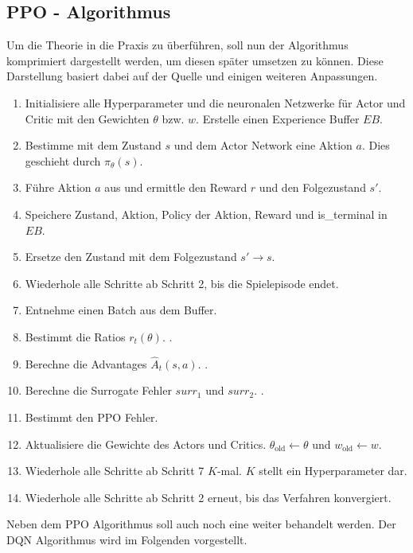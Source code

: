 \subsection{PPO - Algorithmus} \label{subsec:Grundlagen_PPO_Algorithmus}
Um die Theorie in die Praxis zu überführen, soll nun der Algorithmus komprimiert dargestellt werden, um diesen später umsetzen zu können. 
Diese Darstellung basiert dabei auf der Quelle \citep{PPO} und einigen weiteren Anpassungen.
\begin{enumerate}
	\item Initialisiere alle Hyperparameter und die neuronalen Netzwerke für Actor und Critic mit den Gewichten $\theta$ bzw. $w$. Erstelle einen Experience Buffer $EB$.
	\item Bestimme mit dem Zustand $s$ und dem Actor Network eine Aktion $a$. Dies geschieht durch $\pi_{\theta}(s)$.
	\item Führe Aktion $a$ aus und ermittle den Reward $r$ und den Folgezustand $s'$.
	\item Speichere Zustand, Aktion, Policy der Aktion, Reward und is\_terminal in $EB$.
	\item Ersetze den Zustand mit dem Folgezustand $s' \longrightarrow s$.
	\item Wiederhole alle Schritte ab Schritt 2, bis die Spielepisode endet.
	\item Entnehme einen Batch aus dem Buffer.
	\item Bestimmt die Ratios $r_t(\theta)$. .
	\item Berechne die Advantages $\hat{A}_{t}(s, a)$. .
	\item Berechne die Surrogate Fehler $surr_1$ und $surr_2$. .
	\item Bestimmt den PPO Fehler. 
	\item Aktualisiere die Gewichte des Actors und Critics. $\theta_{\text{old}} \longleftarrow \theta$ und $w_{\text{old}} \longleftarrow w$.
	\item Wiederhole alle Schritte ab Schritt 7 $K$-mal. $K$ stellt ein Hyperparameter dar.
	\item Wiederhole alle Schritte ab Schritt 2 erneut, bis das Verfahren konvergiert.
\end{enumerate}
Neben dem PPO Algorithmus soll auch noch eine weiter behandelt werden. Der DQN Algorithmus wird im Folgenden vorgestellt.

